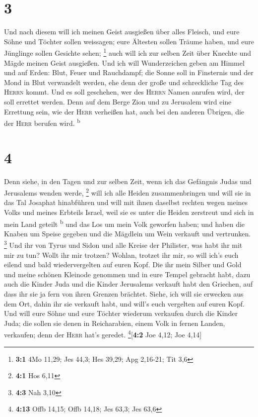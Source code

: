 \hypertarget{section-2}{%
\section{3}\label{section-2}}

 Und nach diesem will ich meinen Geist ausgießen über
alles Fleisch, und eure Söhne und Töchter sollen weissagen; eure
Ältesten sollen Träume haben, und eure Jünglinge sollen Gesichte sehen;
\footnote{\textbf{3:1} 4Mo 11,29; Jes 44,3; Hes 39,29; Apg 2,16-21; Tit
  3,6}  auch will ich zur selben Zeit über Knechte und
Mägde meinen Geist ausgießen.  Und ich will Wunderzeichen
geben am Himmel und auf Erden: Blut, Feuer und Rauchdampf;
 die Sonne soll in Finsternis und der Mond in Blut
verwandelt werden, ehe denn der große und schreckliche Tag des
\textsc{Herrn} kommt.  Und es soll geschehen, wer des
\textsc{Herrn} Namen anrufen wird, der soll errettet werden. Denn auf
dem Berge Zion und zu Jerusalem wird eine Errettung sein, wie der
\textsc{Herr} verheißen hat, auch bei den anderen Übrigen, die der
\textsc{Herr} berufen wird. \textsuperscript{b}

\hypertarget{section-3}{%
\section{4}\label{section-3}}

 Denn siehe, in den Tagen und zur selben Zeit, wenn ich
das Gefängnis Judas und Jerusalems wenden werde, \footnote{\textbf{4:1}
  Hos 6,11}  will ich alle Heiden zusammenbringen und will
sie in das Tal Josaphat hinabführen und will mit ihnen daselbst rechten
wegen meines Volks und meines Erbteils Israel, weil sie es unter die
Heiden zerstreut und sich in mein Land geteilt \textsuperscript{b}
 und das Los um mein Volk geworfen haben; und haben die
Knaben um Speise gegeben und die Mägdlein um Wein verkauft und
vertrunken. \footnote{\textbf{4:3} Nah 3,10}  Und ihr von
Tyrus und Sidon und alle Kreise der Philister, was habt ihr mit mir zu
tun? Wollt ihr mir trotzen? Wohlan, trotzet ihr mir, so will ich's euch
eilend und bald wiedervergelten auf euren Kopf.  Die ihr
mein Silber und Gold und meine schönen Kleinode genommen und in eure
Tempel gebracht habt,  dazu auch die Kinder Juda und die
Kinder Jerusalems verkauft habt den Griechen, auf dass ihr sie ja fern
von ihren Grenzen brächtet.  Siehe, ich will sie erwecken
aus dem Ort, dahin ihr sie verkauft habt, und will's euch vergelten auf
euren Kopf.  Und will eure Söhne und eure Töchter wiederum
verkaufen durch die Kinder Juda; die sollen sie denen in Reicharabien,
einem Volk in fernen Landen, verkaufen; denn der \textsc{Herr} hat's
geredet. \footnote{\textbf{4:13} Offb 14,15; Offb 14,18; Jes 63,3; Jes
  63,6}{[}\textbf{4:2} Joe 4,12; Joe 4,14{]}

